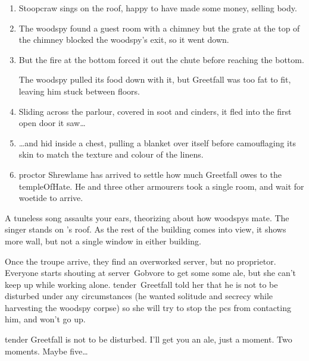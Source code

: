 \documentclass[10pt,twoside]{book}
\begin{document}
\begin{enumerate}\itemsep0em\setcounter{enumi}{\value{diceNo}}
  \item
  Stoopcraw sings on the roof, happy to have made some money, selling  body.
  \label{lt:singer}
  \item
  The \gls{woodspy} found a guest room with a chimney but the grate at the top of the chimney blocked the \gls{woodspy}'s exit, so it went down.
  \label{lt:guestFire}
  \item
  But the fire at the bottom forced it out the chute before reaching the bottom.

  The \gls{woodspy} pulled its food down with it, but Greetfall was too fat to fit, leaving him stuck between floors.
  \label{lt:chimney}
  \item
  Sliding across the parlour, covered in soot and cinders, it fled into the first open door it saw\ldots
  \label{lt:parlour}
  \item
  \ldots and hid inside a chest, pulling a blanket over itself before camouflaging its skin to match the texture and colour of the linens.
  \label{lt:woodspy}
  \item
  \Gls{proctor} Shrewlame has arrived to settle how much Greetfall owes to the \gls{templeOfHate}.
  \label{lt:proctor}
  He and three other \glspl{armourer} took a single room, and wait for \gls{woetide} to arrive.
  \setcounter{diceNo}{\value{enumi}}
\end{enumerate}

\begin{boxtext}
  A tuneless song assaults your ears, theorizing about how \glspl{woodspy} mate.
  The singer stands on 's roof.
  As the rest of the building comes into view, it shows more wall, but not a single window in either building.
\end{boxtext}

Once the troupe arrive, they find an overworked \gls{server}, but no proprietor.
Everyone starts shouting at \gls{server}~Gobvore to get some some ale, but she can't keep up while working alone.
\Gls{tender}~Greetfall told her that he is not to be disturbed under any circumstances (he wanted solitude and secrecy while \gls{harvesting} the \gls{woodspy} corpse) so she will try to stop the \glspl{pc} from contacting him, and won't go up.

\begin{speechtext}
  \Gls{tender} Greetfall is not to be disturbed.
  I'll get you an ale, just a moment.
  Two moments.
  Maybe five\ldots
\end{speechtext}
\end{document}
